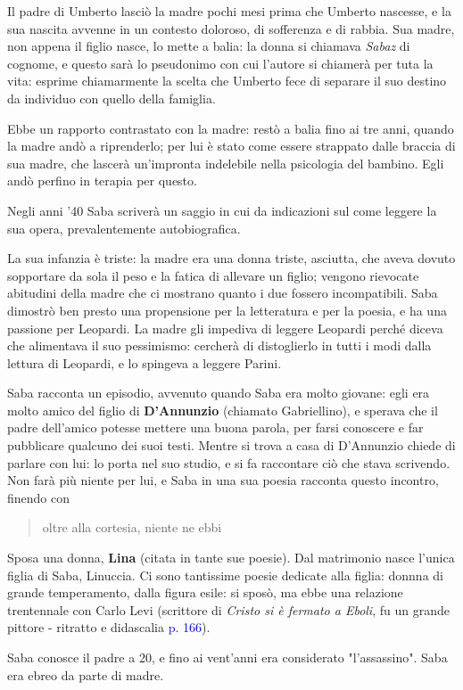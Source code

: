 \documentclass[a4paper, twoside, titlepage]{book}
\newcounter{mar}
\newcommand{\citazione}[1]{%
  \begin{quotation}
  \begin{linenumbers}
  \modulolinenumbers[5]
  \begingroup
  \setlength{\parindent}{0cm}
  \noindent #1
  \endgroup
  \end{linenumbers}
  \end{quotation}\setcounter{linenumber}{1}
  }
\renewcommand{\emph}[1]{\textcolor{blue}{#1}}
\begin{document}
Il padre di Umberto lasciò la madre pochi mesi prima che Umberto nascesse, e la sua nascita avvenne in un contesto doloroso, di sofferenza e di rabbia.
Sua madre, non appena il figlio nasce, lo mette a balia: la donna si chiamava \textit{Sabaz} di cognome, e questo sarà lo pseudonimo con cui l'autore si chiamerà per tuta la vita: esprime chiamarmente la scelta che Umberto fece di separare il suo destino da individuo con quello della famiglia.

Ebbe un rapporto contrastato con la madre: restò a balia fino ai tre anni, quando la madre andò a riprenderlo; per lui è stato come essere strappato dalle braccia di sua madre, che lascerà un'impronta indelebile nella psicologia del bambino. Egli andò perfino in terapia per questo.

Negli anni '40 Saba scriverà un saggio in cui da indicazioni sul come leggere la sua opera, prevalentemente autobiografica.

La sua infanzia è triste: la madre era una donna triste, asciutta, che aveva dovuto sopportare da sola il peso e la fatica di allevare un figlio; vengono rievocate abitudini della madre che ci mostrano quanto i due fossero incompatibili. Saba dimostrò ben presto una propensione per la letteratura e per la poesia, e ha una passione per Leopardi. La madre gli impediva di leggere Leopardi perché diceva che alimentava il suo pessimismo: cercherà di distoglierlo in tutti i modi dalla lettura di Leopardi, e lo spingeva a leggere Parini.

Saba racconta un episodio, avvenuto quando Saba era molto giovane: egli era molto amico del figlio di \textbf{D'Annunzio} (chiamato Gabriellino), e sperava che il padre dell'amico potesse mettere una buona parola, per farsi conoscere e far pubblicare qualcuno dei suoi testi. 
Mentre si trova a casa di D'Annunzio chiede di parlare con lui: lo porta nel suo studio, e si fa raccontare ciò che stava scrivendo. Non farà più niente per lui, e Saba in una sua poesia racconta questo incontro, finendo con 
\citazione{oltre alla cortesia, niente ne ebbi}

Sposa una donna, \textbf{Lina} (citata in tante sue poesie). Dal matrimonio nasce l'unica figlia di Saba, Linuccia.
Ci sono tantissime poesie dedicate alla figlia: donnna di grande temperamento, dalla figura esile: si sposò, ma ebbe una relazione trentennale con Carlo Levi (scrittore di \textit{Cristo si è fermato a Eboli}, fu un grande pittore - ritratto e didascalia \emph{p. 166}).


Saba conosce il padre a 20, e fino ai vent'anni era considerato "l'assassino".
Saba era ebreo da parte di madre. 
\end{document}
